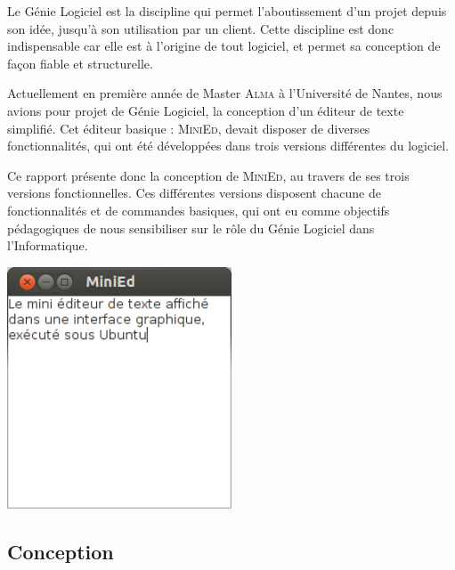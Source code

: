 \documentclass[a4paper]{article}
\begin{document}
	\vspace{0.5cm}

	Le Génie Logiciel est la discipline qui permet l’aboutissement d’un projet depuis son idée, jusqu’à son utilisation par un client. Cette discipline est donc indispensable car elle est à l’origine de tout logiciel, et permet sa conception de façon fiable et structurelle.

	\vspace{0.5cm}

	Actuellement en première année de Master \textsc{Alma} à l’Université de Nantes, nous avions pour projet de Génie Logiciel, la conception d’un éditeur de texte simplifié. Cet éditeur basique : \textsc{MiniEd}, devait disposer de diverses fonctionnalités, qui ont été développées dans trois versions différentes du logiciel.  

	\vspace{0.5cm}

	Ce rapport présente donc la conception de \textsc{MiniEd}, au travers de ses trois versions fonctionnelles. Ces différentes versions disposent chacune de fonctionnalités et de commandes basiques, qui ont eu comme objectifs pédagogiques de nous sensibiliser sur le rôle du Génie Logiciel dans l'Informatique.

	\vspace{2.5cm}

	\begin{center}
		\includegraphics[width=0.5\textwidth]{MiniEd_capture.png}~
	\end{center}

	\newpage



	\begin{center}
		\section{Conception}
	\end{center}
\end{document}
